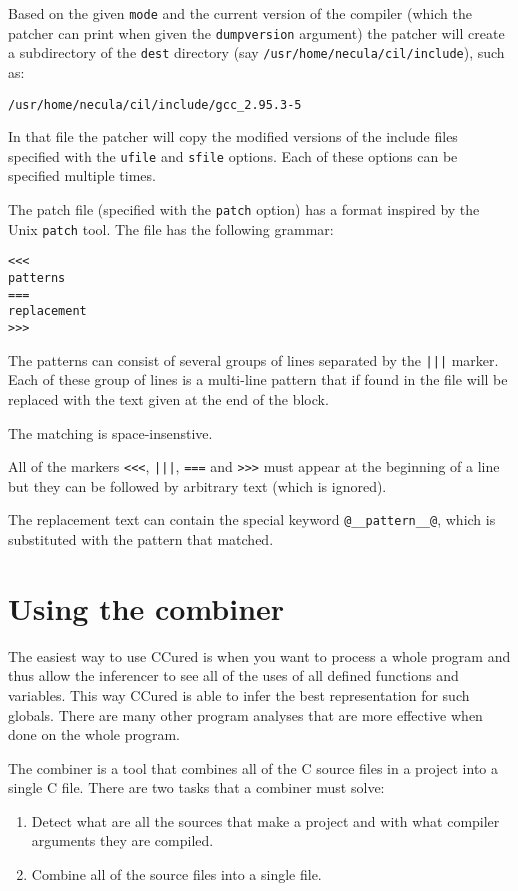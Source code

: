 \documentclass{book}
\def\t#1{{\tt #1}}
\begin{document}
 Based on the given \t{mode} and the current version of the compiler (which
the patcher can print when given the \t{dumpversion} argument) the patcher
will create a subdirectory of the \t{dest} directory (say \t{/usr/home/necula/cil/include}), such as:
\begin{verbatim}
/usr/home/necula/cil/include/gcc_2.95.3-5
\end{verbatim}

 In that file the patcher will copy the modified versions of the include files
specified with the \t{ufile} and \t{sfile} options. Each of these options can
be specified multiple times. 

 The patch file (specified with the \t{patch} option) has a format inspired by
the Unix \t{patch} tool. The file has the following grammar:

\begin{verbatim}
<<<
patterns
===
replacement
>>>
\end{verbatim}

 The patterns can consist of several groups of lines separated by the \t{|||}
marker. Each of these group of lines is a multi-line pattern that if found in
the file will be replaced with the text given at the end of the block. 

 The matching is space-insenstive.

 All of the markers \t{<<<}, \t{|||}, \t{===} and \t{>>>} must appear at the
beginning of a line but they can be followed by arbitrary text (which is
ignored).

 The replacement text can contain the special keyword \t{@\_\_pattern\_\_@},
which is substituted with the pattern that matched. 

  \chapter{Using the combiner}\label{ch-combiner}

 The easiest way to use CCured is when you want to process a whole program and
thus allow the inferencer to see all of the uses of all defined functions and
variables. This way CCured is able to infer the best representation for such
globals. There are many other program analyses that are more effective when
done on the whole program.

 The combiner is a tool that combines all of the C source files in a project
into a single C file. There are two tasks that a combiner must solve:
\begin{enumerate}
\item Detect what are all the sources that make a project and with what
compiler arguments they are compiled.

\item Combine all of the source files into a single file. 
\end{enumerate}
\end{document}
